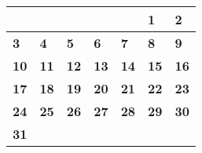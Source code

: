 \documentclass[a4paper,landscape]{jsarticle}
\newcommand{\dig}{\hspace{29mm}}
\newcommand{\tdig}{\hspace{27mm}}
\newcommand{\LBF}{\LARGE\textbf}
\begin{document}
\begingroup
\renewcommand{\arraystretch}{4}
\begin{tabular}{|p{32mm}|p{32mm}|p{32mm}|p{32mm}|p{32mm}|p{32mm}|p{32mm}|}
\hline
&&&&&\raisebox{30pt} {\dig\LBF{1}}&\raisebox{30pt} {\dig\LBF{2}}\\
\hline
\raisebox{30pt} {\dig\LBF{3}}&\raisebox{30pt} {\dig\LBF{4}}&\raisebox{30pt} {\dig\LBF{5}}&\raisebox{30pt} {\dig\LBF{6}}&\raisebox{30pt} {\dig\LBF{7}}&\raisebox{30pt} {\dig\LBF{8}}&\raisebox{30pt} {\dig\LBF{9}}\\
\hline
\raisebox{30pt} {\tdig\LBF{10}}&\raisebox{30pt} {\tdig\LBF{11}}&\raisebox{30pt} {\tdig\LBF{12}}&\raisebox{30pt} {\tdig\LBF{13}}&\raisebox{30pt} {\tdig\LBF{14}}&\raisebox{30pt} {\tdig\LBF{15}}&\raisebox{30pt} {\tdig\LBF{16}}\\
\hline
\raisebox{30pt} {\tdig\LBF{17}}&\raisebox{30pt} {\tdig\LBF{18}}&\raisebox{30pt} {\tdig\LBF{19}}&\raisebox{30pt} {\tdig\LBF{20}}&\raisebox{30pt} {\tdig\LBF{21}}&\raisebox{30pt} {\tdig\LBF{22}}&\raisebox{30pt} {\tdig\LBF{23}}\\
\hline
\raisebox{30pt} {\tdig\LBF{24}}&\raisebox{30pt} {\tdig\LBF{25}}&\raisebox{30pt} {\tdig\LBF{26}}&\raisebox{30pt} {\tdig\LBF{27}}&\raisebox{30pt} {\tdig\LBF{28}}&\raisebox{30pt} {\tdig\LBF{29}}&\raisebox{30pt} {\tdig\LBF{30}}\\
\hline
\raisebox{30pt} {\tdig\LBF{31}}&&&&&&\\
\hline
\end{tabular}
\endgroup
\newpage
\end{document}
